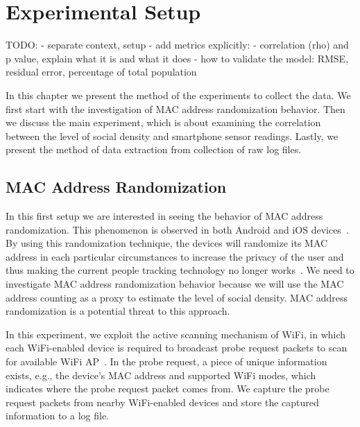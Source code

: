 \chapter{Experimental Setup}
\label{ch:experimental-setup} %

TODO:
- separate context, setup
- add metrics explicitly:
	- correlation (rho) and p value, explain what it is and what it does
	- how to validate the model: RMSE, residual error, percentage of total population


In this chapter we present the method of the experiments to collect the data. We first start with the investigation of \ac{MAC} address randomization behavior. Then we discuss the main experiment, which is about examining the correlation between the level of social density and smartphone sensor readings. Lastly, we present the method of data extraction from collection of raw log files.

\section{MAC Address Randomization} %
\label{sec:mac_address_randomization}
In this first setup we are interested in seeing the behavior of \ac{MAC} address randomization. This phenomenon is observed in both Android and iOS devices~\cite{thesis061}. By using this randomization technique, the devices will randomize its \ac{MAC} address in each particular circumstances to increase the privacy of the user and thus making the current people tracking technology no longer works~\cite{thesis079}. We need to investigate \ac{MAC} address randomization behavior because we will use the \ac{MAC} address counting as a proxy to estimate the level of social density. \ac{MAC} address randomization is a potential threat to this approach. 

In this experiment, we exploit the active scanning mechanism of WiFi, in which each WiFi-enabled device is required to broadcast probe request packets to scan for available WiFi \ac{AP}~\cite{thesis082}. In the probe request, a piece of unique information exists, e.g., the device's \ac{MAC} address and supported WiFi modes, which indicates where the probe request packet comes from. We capture the probe request packets from nearby WiFi-enabled devices and store the captured information to a log file.

